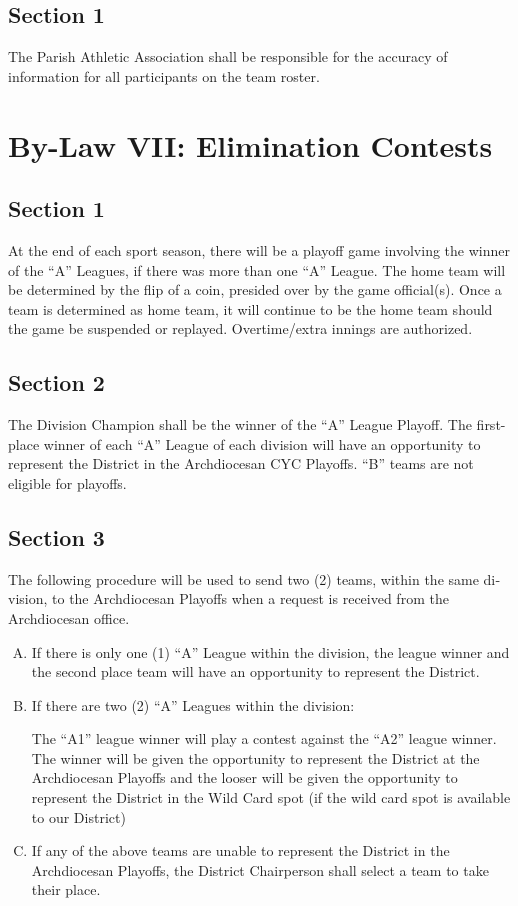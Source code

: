 \subsection{Section 1}
The Parish Athletic Association shall be responsible for the accuracy of information for all participants on the team roster.

\section{By-Law VII: Elimination Contests}
\subsection{Section 1}
At the end of each sport season, there will be a playoff game involving the win­ner of the ``A'' Leagues, if there was more than one “A” League.  The home team will be determined by the flip of a coin, pre­sided over by the game official(s).  Once a team is determined as home team, it will continue to be the home team should the game be suspended or replayed.   Overtime/extra innings are authorized.

\subsection{Section 2}
The Division Champion shall be the winner of the ``A'' League Playoff.  The first-place winner of each ``A'' League of each division will have an opportunity to represent the District in the Archdiocesan CYC Playoffs. “B” teams are not eligible for playoffs.

\subsection{Section 3}
The following procedure will be used to send two (2) teams, within the same di­vision, to the Archdiocesan Playoffs when a request is received from the Archdiocesan office.

\begin{enumerate}[A.]
    \item If there is only one (1) ``A'' League within the division, the league winner and the sec­ond place team will have an opportunity to represent the District.
    \item If there are two (2) ``A'' Leagues within the division:
    
    The ``A1'' league winner will play a contest against the “A2” league winner. The winner will be given the opportunity to represent the District at the Archdiocesan Playoffs and the looser will be given the opportunity to represent the District in the Wild Card spot (if the wild card spot is available to our District)

    \item If any of the above teams are unable to represent the District in the Archdiocesan Playoffs, the District Chairperson shall select a team to take their place.
\end{enumerate}

